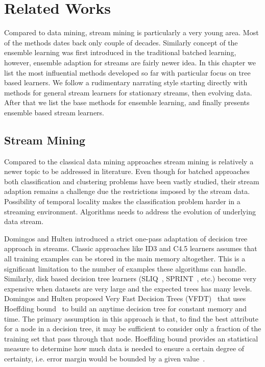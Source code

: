 \chapter{Related Works}
\label{chp:relworks}
Compared to data mining, stream mining is particularly a very young area. Most of the methods dates back only couple of decades. Similarly concept of the ensemble learning was first introduced in the traditional batched learning, however, ensemble adaption for streams are fairly newer idea. In this chapter we list the most influential methods developed so far with particular focus on tree based learners. We follow a rudimentary narrating style starting directly with methods for general stream learners for stationary streams, then evolving data. After that we list the base methods for ensemble learning, and finally presents ensemble based stream learners.

\section{Stream Mining}
Compared to the classical data mining approaches stream mining is relatively a newer topic to be addressed in literature. Even though for batched approaches both classification and clustering problems have been vastly studied, their stream adaption remains a challenge due the restrictions imposed by the stream data. Possibility of temporal locality makes the classification problem harder in a streaming environment. Algorithms needs to address the evolution of underlying data stream. 

Domingos and Hulten introduced a strict one-pass adaptation of decision tree~\cite{breiman84:dt,quinlan93:c45} approach in streams. Classic approaches like ID3 and C4.5 learners assumes that all training examples can be stored in the main memory altogether. This is a significant limitation to the number of examples these algorithms can handle. Similarly, disk based decision tree learners (SLIQ~\cite{mehta96:sliq}, SPRINT~\cite{shafer96:sprint}, etc.) become very expensive when datasets are very large and the expected trees has many levels. Domingos and Hulten proposed Very Fast Decision Trees (VFDT)~\cite{domingos00:vfdt} that uses Hoeffding bound~\cite{hoeffding63:bound} to build an anytime decision tree for constant memory and time. The primary assumption in this approach is that, to find the best attribute for a node in a decision tree, it may be sufficient to consider only a fraction of the training set that pass through that node. Hoeffding bound provides an statistical measure to determine how much data is needed to ensure a certain degree of certainty, i.e. error margin would be bounded by a given value~\cite{catlett91:thesis}.

